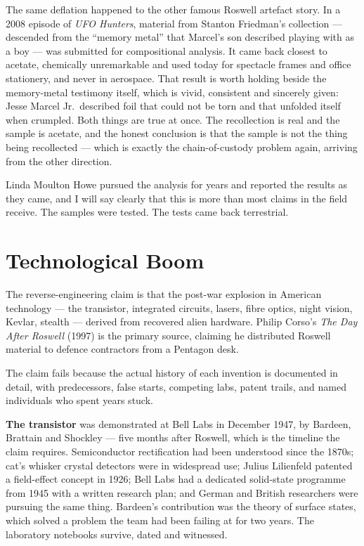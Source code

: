 The same deflation happened to the other famous Roswell artefact story. In a 2008 episode of
\emph{UFO Hunters}, material from Stanton Friedman's collection --- descended from the ``memory metal''
that Marcel's son described playing with as a boy --- was submitted for compositional analysis. It came
back closest to acetate, chemically unremarkable and used today for spectacle frames and office
stationery, and never in aerospace. That result is worth holding beside the memory-metal testimony
itself, which is vivid, consistent and sincerely given: Jesse Marcel Jr.\ described foil that could
not be torn and that unfolded itself when crumpled. Both things are true at once. The recollection is
real and the sample is acetate, and the honest conclusion is that the sample is not the thing being
recollected --- which is exactly the chain-of-custody problem again, arriving from the other direction.

Linda Moulton Howe pursued the analysis for years and reported the results as they came, and I
will say clearly that this is more than most claims in the field receive. The samples were tested.
The tests came back terrestrial. 

\section{Technological Boom}\label{sec:technologicalboom}

The reverse-engineering claim is that the post-war explosion in American technology --- the
transistor, integrated circuits, lasers, fibre optics, night vision, Kevlar, stealth --- derived
from recovered alien hardware. Philip Corso's \emph{The Day After Roswell} (1997) is the primary
source, claiming he distributed Roswell material to defence contractors from a Pentagon desk.

The claim fails because the actual history of each invention is documented in detail, with
predecessors, false starts, competing labs, patent trails, and named individuals who spent years
stuck.

\textbf{The transistor} was demonstrated at Bell Labs in December 1947, by Bardeen, Brattain and
Shockley --- five months after Roswell, which is the timeline the claim requires. Semiconductor
rectification had been understood since the 1870s; cat's whisker crystal detectors were in
widespread use; Julius Lilienfeld patented a field-effect concept in 1926; Bell Labs had a
dedicated solid-state programme from 1945 with a written research plan; and German and British
researchers were pursuing the same thing. Bardeen's contribution was the theory of surface states,
which solved a problem the team had been failing at for two years. The laboratory notebooks
survive, dated and witnessed.

